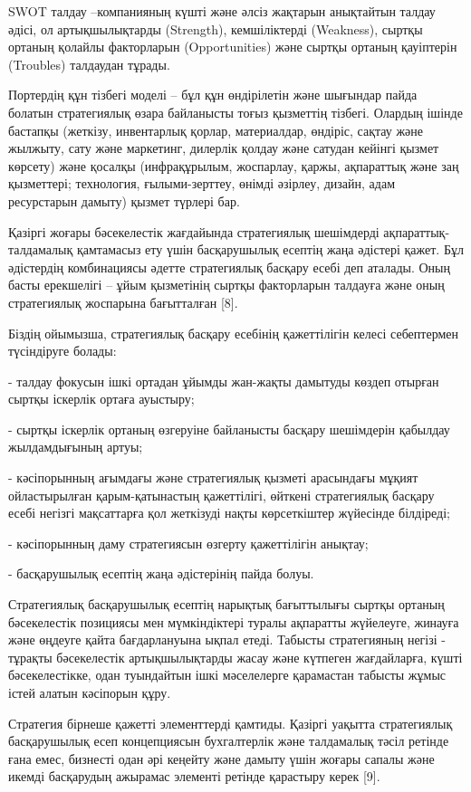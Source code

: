 SWOT талдау --компанияның күшті және әлсіз жақтарын анықтайтын талдау
әдісі, ол артықшылықтарды (Strength), кемшіліктерді (Weakness), сыртқы
ортаның қолайлы факторларын (Opportunities) және сыртқы ортаның
қауіптерін (Troubles) талдаудан тұрады.

Портердің құн тізбегі моделі -- бұл құн өндірілетін және шығындар пайда
болатын стратегиялық өзара байланысты тоғыз қызметтің тізбегі. Олардың
ішінде бастапқы (жеткізу, инвентарлық қорлар, материалдар, өндіріс,
сақтау және жылжыту, сату және маркетинг, дилерлік қолдау және сатудан
кейінгі қызмет көрсету) және қосалқы (инфрақұрылым, жоспарлау, қаржы,
ақпараттық және заң қызметтері; технология, ғылыми-зерттеу, өнімді
әзірлеу, дизайн, адам ресурстарын дамыту) қызмет түрлері бар.

Қазіргі жоғары бәсекелестік жағдайында стратегиялық шешімдерді
ақпараттық-талдамалық қамтамасыз ету үшін басқарушылық есептің жаңа
әдістері қажет. Бұл әдістердің комбинациясы әдетте стратегиялық басқару
есебі деп аталады. Оның басты ерекшелігі -- ұйым қызметінің сыртқы
факторларын талдауға және оның стратегиялық жоспарына бағытталған
{[}8{]}.

Біздің ойымызша, стратегиялық басқару есебінің қажеттілігін келесі
себептермен түсіндіруге болады:

- талдау фокусын ішкі ортадан ұйымды жан-жақты дамытуды көздеп отырған
сыртқы іскерлік ортаға ауыстыру;

- сыртқы іскерлік ортаның өзгеруіне байланысты басқару шешімдерін
қабылдау жылдамдығының артуы;

- кәсіпорынның ағымдағы және стратегиялық қызметі арасындағы мұқият
ойластырылған қарым-қатынастың қажеттілігі, өйткені стратегиялық басқару
есебі негізгі мақсаттарға қол жеткізуді нақты көрсеткіштер жүйесінде
білдіреді;

- кәсіпорынның даму стратегиясын өзгерту қажеттілігін анықтау;

- басқарушылық есептің жаңа әдістерінің пайда болуы.

Стратегиялық басқарушылық есептің нарықтық бағыттылығы сыртқы ортаның
бәсекелестік позициясы мен мүмкіндіктері туралы ақпаратты жүйелеуге,
жинауға және өңдеуге қайта бағдарлануына ықпал етеді. Табысты
стратегияның негізі - тұрақты бәсекелестік артықшылықтарды жасау және
күтпеген жағдайларға, күшті бәсекелестікке, одан туындайтын ішкі
мәселелерге қарамастан табысты жұмыс істей алатын кәсіпорын құру.

Стратегия бірнеше қажетті элементтерді қамтиды. Қазіргі уақытта
стратегиялық басқарушылық есеп концепциясын бухгалтерлік және талдамалық
тәсіл ретінде ғана емес, бизнесті одан әрі кеңейту және дамыту үшін
жоғары сапалы және икемді басқарудың ажырамас элементі ретінде қарастыру
керек {[}9{]}.

